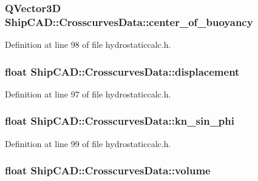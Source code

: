 \subsubsection[{\texorpdfstring{center\+\_\+of\+\_\+buoyancy}{center_of_buoyancy}}]{\setlength{\rightskip}{0pt plus 5cm}Q\+Vector3D Ship\+C\+A\+D\+::\+Crosscurves\+Data\+::center\+\_\+of\+\_\+buoyancy}\hypertarget{structShipCAD_1_1CrosscurvesData_a0de723cd5ae0e18953fb7ad5a0f5dadf}{}\label{structShipCAD_1_1CrosscurvesData_a0de723cd5ae0e18953fb7ad5a0f5dadf}


Definition at line 98 of file hydrostaticcalc.\+h.

\subsubsection[{\texorpdfstring{displacement}{displacement}}]{\setlength{\rightskip}{0pt plus 5cm}float Ship\+C\+A\+D\+::\+Crosscurves\+Data\+::displacement}\hypertarget{structShipCAD_1_1CrosscurvesData_a9a7baa66159e203888390eaa63caf708}{}\label{structShipCAD_1_1CrosscurvesData_a9a7baa66159e203888390eaa63caf708}


Definition at line 97 of file hydrostaticcalc.\+h.

\subsubsection[{\texorpdfstring{kn\+\_\+sin\+\_\+phi}{kn_sin_phi}}]{\setlength{\rightskip}{0pt plus 5cm}float Ship\+C\+A\+D\+::\+Crosscurves\+Data\+::kn\+\_\+sin\+\_\+phi}\hypertarget{structShipCAD_1_1CrosscurvesData_a55150860fed821e314e18b72f1975749}{}\label{structShipCAD_1_1CrosscurvesData_a55150860fed821e314e18b72f1975749}


Definition at line 99 of file hydrostaticcalc.\+h.

\subsubsection[{\texorpdfstring{volume}{volume}}]{\setlength{\rightskip}{0pt plus 5cm}float Ship\+C\+A\+D\+::\+Crosscurves\+Data\+::volume}\hypertarget{structShipCAD_1_1CrosscurvesData_a9bec38a77bf87ab5feb76899e39e4f7b}{}\label{structShipCAD_1_1CrosscurvesData_a9bec38a77bf87ab5feb76899e39e4f7b}


